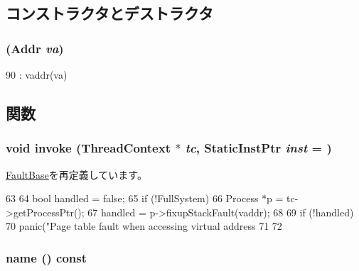 \subsection{コンストラクタとデストラクタ}
\hypertarget{classGenericPageTableFault_ab826e9f22292069df6ccf4b5d48874c2}{
\subsubsection[{GenericPageTableFault}]{ ({\bf Addr} {\em va})}}
\label{classGenericPageTableFault_ab826e9f22292069df6ccf4b5d48874c2}



\begin{DoxyCode}
90 : vaddr(va) {}
\end{DoxyCode}


\subsection{関数}
\hypertarget{classGenericPageTableFault_a2bd783b42262278d41157d428e1f8d6f}{
\subsubsection[{invoke}]{\setlength{\rightskip}{0pt plus 5cm}void invoke ({\bf ThreadContext} $\ast$ {\em tc}, \/  {\bf StaticInstPtr} {\em inst} = {})}}
\label{classGenericPageTableFault_a2bd783b42262278d41157d428e1f8d6f}


\hyperlink{classFaultBase_a2bd783b42262278d41157d428e1f8d6f}{FaultBase}を再定義しています。


\begin{DoxyCode}
63 {
64     bool handled = false;
65     if (!FullSystem) {
66         Process *p = tc->getProcessPtr();
67         handled = p->fixupStackFault(vaddr);
68     }
69     if (!handled)
70         panic("Page table fault when accessing virtual address %
71 
72 }
\end{DoxyCode}
\hypertarget{classGenericPageTableFault_a73adb23259baf912a81683a9790a303f}{
\subsubsection[{name}]{ name () const}}
\label{classGenericPageTableFault_a73adb23259baf912a81683a9790a303f}


